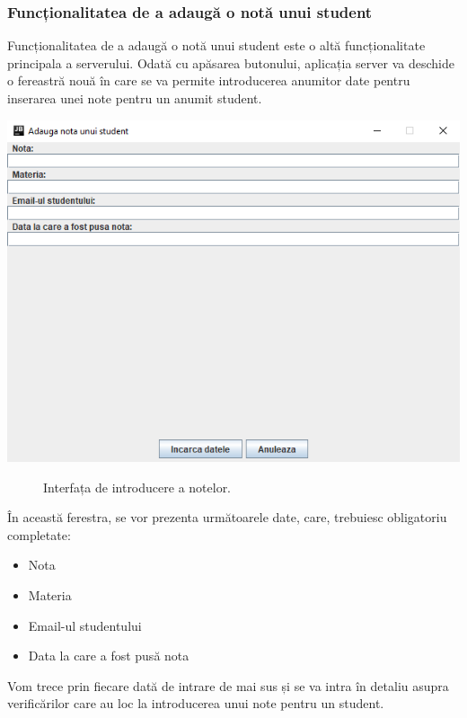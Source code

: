 \documentclass{article}
\begin{document}
			\subsubsection{Funcționalitatea de a adaugă o notă unui student}

	Funcționalitatea de a adaugă o notă unui student este o altă funcționalitate principala a serverului. Odată cu apăsarea butonului, aplicația server va deschide o fereastră nouă în care se va permite introducerea anumitor date pentru inserarea unei note pentru un anumit student. \\

	\begin{center}
		\includegraphics[scale=0.8]{Source/ServerNota}
		\begin{figure}[!h]
			{\caption*{Interfața de introducere a notelor.}}
		\end{figure}
	\end{center}

	În această ferestra, se vor prezenta următoarele date, care, trebuiesc obligatoriu completate:
	\begin{itemize}
		\item Nota
		\item Materia
		\item Email-ul studentului
		\item Data la care a fost pusă nota
	\end{itemize}

	Vom trece prin fiecare dată de intrare de mai sus și se va intra în detaliu asupra verificărilor care au loc la introducerea unui note pentru un student.
\end{document}
